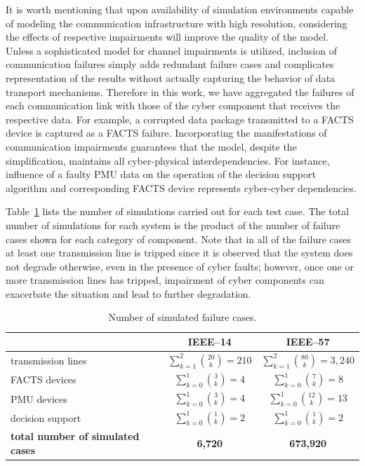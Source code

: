 \documentclass[12pt]{elsarticle}
\begin{document}
It is worth mentioning that upon availability of simulation environments capable of modeling the communication infrastructure with high resolution, considering the effects of respective impairments will improve the quality of the model. Unless a sophisticated model for channel impairments is utilized, inclusion of communication failures simply adds redundant failure cases and complicates representation of the results without actually capturing the behavior of data transport mechanisms. Therefore in this work, we have aggregated the failures of each communication link with those of the cyber component that receives the respective data. For example, a corrupted data package transmitted to a FACTS device is captured as a FACTS failure. Incorporating the manifestations of communication impairments guarantees that the model, despite the simplification, maintains all cyber-physical interdependencies. For instance, influence of a faulty PMU data on the operation of the decision support algorithm and corresponding FACTS device represents cyber-cyber dependencies.

Table~\ref{tab:failure_cases} lists the number of simulations carried out for each test case. The total number of simulations for each system is the product of the number of failure cases shown for each category of component. Note that in all of the failure cases at least one transmission line is tripped since it is observed that the system does not degrade otherwise, even in the presence of cyber faults; however, once one or more transmission lines has tripped, impairment of cyber components can exacerbate the situation and lead to further degradation.

\begin{table}[!t]
\caption{Number of simulated failure cases.}
\label{tab:failure_cases}
\footnotesize
\centering
\renewcommand{\arraystretch}{1.3}
\begin{tabular}{m{}|c|c}
  & IEEE--14 & IEEE--57 \\ \hline
  transmission lines & $\sum\limits_{k=1}^2\binom{20}{k} = 210$ & $\sum\limits_{k=1}^2\binom{80}{k} = 3,240$ \\
  FACTS devices & $\sum\limits_{k=0}^1\binom{3}{k} = 4$ & $\sum\limits_{k=0}^1\binom{7}{k} = 8$ \\
  PMU devices & $\sum\limits_{k=0}^1\binom{3}{k} = 4$ & $\sum\limits_{k=0}^1\binom{12}{k} = 13$ \\
  decision support & $\sum\limits_{k=0}^1\binom{1}{k} = 2$ & $\sum\limits_{k=0}^1\binom{1}{k} = 2$ \\ \hline
  \textbf{total number of simulated cases} & \textbf{6,720} & \textbf{673,920}
\end{tabular}
\end{table}
\end{document}
